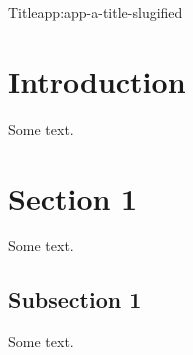 \begin{appchaptercover}{Title}{app:app-a-title-slugified}

\section{Introduction}
Some text.

\section{Section 1}
Some text.

\subsection{Subsection 1}
Some text.

\end{appchaptercover}
